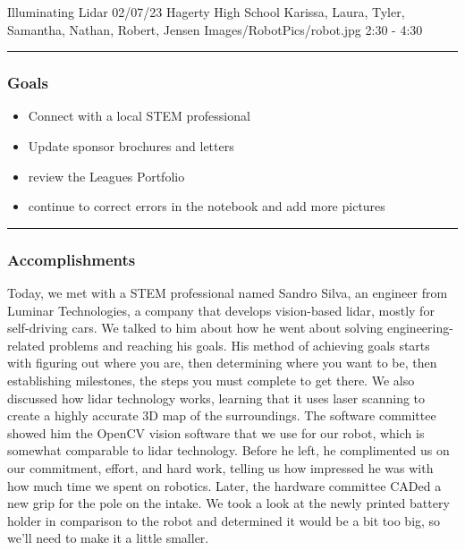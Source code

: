 \insertmeeting 
	{Illuminating Lidar} 
	{02/07/23} 
	{Hagerty High School}
	{Karissa, Laura, Tyler,  Samantha, Nathan, Robert, Jensen}
	{Images/RobotPics/robot.jpg}
	{2:30 - 4:30}
	
\noindent\hfil\rule{\textwidth}{.4pt}\hfil
\subsubsection*{Goals}
\begin{itemize}
    \item Connect with a local STEM professional
    \item Update sponsor brochures and letters 
    \item review the Leagues Portfolio
    \item continue to correct errors in the notebook and add more pictures

\end{itemize} 

\noindent\hfil\rule{\textwidth}{.4pt}\hfil

\subsubsection*{Accomplishments}
Today, we met with a STEM professional named Sandro Silva, an engineer from Luminar Technologies, a company that develops vision-based lidar, mostly for self-driving cars. We talked to him about how he went about solving engineering-related problems and reaching his goals. His method of achieving goals starts with figuring out where you are, then determining where you want to be, then establishing milestones, the steps you must complete to get there. We also discussed how lidar technology works, learning that it uses laser scanning to create a highly accurate 3D map of the surroundings. The software committee showed him the OpenCV vision software that we use for our robot, which is somewhat comparable to lidar technology. Before he left, he complimented us on our commitment, effort, and hard work, telling us how impressed he was with how much time we spent on robotics. Later, the hardware committee CADed a new grip for the pole on the intake. We took a look at the newly printed battery holder in comparison to the robot and determined it would be a bit too big, so we’ll need to make it a little smaller. 

